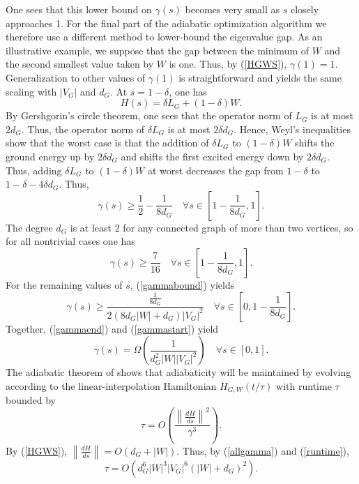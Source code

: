 One sees that this lower bound on $\gamma(s)$ becomes very small as
$s$ closely approaches 1. For the final part of the adiabatic
optimization algorithm we therefore use a different method to
lower-bound the eigenvalue gap. As an illustrative example, we suppose
that the gap between the minimum of $W$ and the second smallest value
taken by $W$ is one. Thus, by (\ref{HGWS}), $\gamma(1) =
1$. Generalization to other values of $\gamma(1)$ is straightforward and
yields the same scaling with $|V_G|$ and $d_G$. At $s = 1 - \delta$,
one has
\begin{equation}
H(s) = \delta L_G + (1-\delta) W.
\end{equation}
By Gershgorin's circle theorem, one sees that the operator norm of
$L_G$ is at most $2 d_G$. Thus, the operator norm of $\delta L_G$ is
at most $2 \delta d_G$. Hence, Weyl's inequalities show that the worst
case is that the addition of $\delta L_G$ to $(1-\delta)W$ shifts the
ground energy up by $2 \delta d_G$ and shifts the first excited energy
down by $2 \delta d_G$. Thus, adding $\delta L_G$ to $(1-\delta) W$ at
worst decreases the gap from $1-\delta$ to $1-\delta-4 \delta
d_G$. Thus,
\begin{equation}
\gamma(s) \geq \frac{1}{2}-\frac{1}{8 d_G} \quad \forall s \in
\left[1-\frac{1}{8 d_G},1\right].
\end{equation}
The degree $d_G$ is at least 2 for any connected graph of more than
two vertices, so for all nontrivial cases one has
\begin{equation}
\label{gammaend}
\gamma(s) \geq \frac{7}{16} \quad \forall s \in
\left[1-\frac{1}{8 d_G},1\right].
\end{equation}
For the remaining values of $s$, (\ref{gammabound}) yields
\begin{equation}
\label{gammastart}
\gamma(s) \geq \frac{\frac{1}{8 d_G}}
{2 \left( 8 d_G |W| + d_G \right) |V_G|^2} 
\quad \forall s \in \left[0,1-\frac{1}{8 d_G} \right].
\end{equation}
Together, (\ref{gammaend}) and (\ref{gammastart}) yield
\begin{equation}
\label{allgamma}
\gamma(s) = \Omega \left( \frac{1}{d_G^2 |W| |V_G|^2} \right)
\quad \forall s \in [0,1].
\end{equation}
The adiabatic theorem of \cite{JRS07} shows that adiabaticity will be
maintained by evolving according to the linear-interpolation
Hamiltonian $H_{G,W}(t/\tau)$ with runtime $\tau$ bounded by
\begin{equation}
\label{runtime}
\tau = O \left( \frac{ \left\| \frac{dH}{ds} \right\|^2}{\gamma^3} \right).
\end{equation}
By (\ref{HGWS}), $\left\| \frac{dH}{ds} \right\| = O(d_G + |W|)$. Thus,
by (\ref{allgamma}) and (\ref{runtime}),
\begin{equation}
\tau = O \left( d_G^6 |W|^3 |V_G|^6 (|W|+d_G)^2 \right).
\end{equation}

